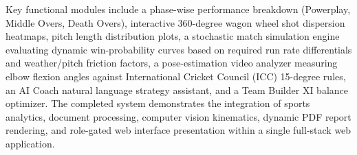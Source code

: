 \documentclass[12pt,a4paper]{report}
\begin{document}
Key functional modules include a phase-wise performance breakdown (Powerplay, Middle Overs, Death Overs), interactive 360-degree wagon wheel shot dispersion heatmaps, pitch length distribution plots, a stochastic match simulation engine evaluating dynamic win-probability curves based on required run rate differentials and weather/pitch friction factors, a pose-estimation video analyzer measuring elbow flexion angles against International Cricket Council (ICC) 15-degree rules, an AI Coach natural language strategy assistant, and a Team Builder XI balance optimizer. The completed system demonstrates the integration of sports analytics, document processing, computer vision kinematics, dynamic PDF report rendering, and role-gated web interface presentation within a single full-stack web application.

\clearpage


\tableofcontents
\clearpage


\listoffigures
\clearpage


\setcounter{page}{1}









\end{document}
